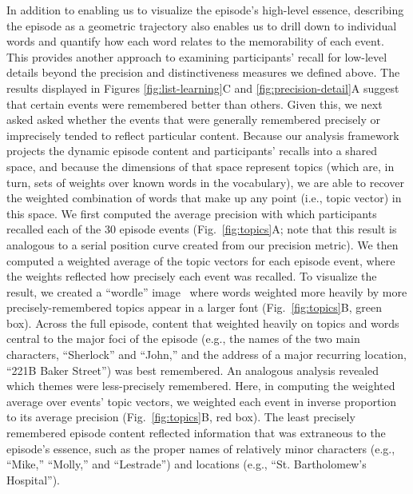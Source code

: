 \documentclass[10pt]{article}
\begin{document}
In addition to enabling us to visualize the episode's high-level essence, describing the episode as a geometric trajectory also enables us to drill down to individual words and quantify how each word relates to the memorability of each event.  This provides another approach to examining participants' recall for low-level details beyond the precision and distinctiveness measures we defined above.  The results displayed in Figures \ref{fig:list-learning}C and \ref{fig:precision-detail}A suggest that certain events were remembered better than others.  Given this, we next asked asked whether the events that were generally remembered precisely or imprecisely tended to reflect particular content.  Because our analysis framework projects the dynamic episode content and participants' recalls into a shared space, and because the dimensions of that space represent topics (which are, in turn, sets of weights over known words in the vocabulary), we are able to recover the weighted combination of words that make up any point (i.e., topic vector) in this space.  We first computed the average precision with which participants recalled each of the 30 episode events (Fig.~\ref{fig:topics}A; note that this result is analogous to a serial position curve created from our precision metric).  We then computed a weighted average of the topic vectors for each episode event, where the weights reflected how precisely each event was recalled.  To visualize the result, we created a ``wordle'' image~\citep{MuelEtal18} where words weighted more heavily by more precisely-remembered topics appear in a larger font (Fig.~\ref{fig:topics}B, green box).  Across the full episode, content that weighted heavily on topics and words central to the major foci of the episode (e.g., the names of the two main characters, ``Sherlock'' and ``John,'' and the address of a major recurring location, ``221B Baker Street'') was best remembered.  An analogous analysis revealed which themes were less-precisely remembered.  Here, in computing the weighted average over events' topic vectors, we weighted each event in inverse proportion to its average precision (Fig.~\ref{fig:topics}B, red box).  The least precisely remembered episode content reflected information that was extraneous to the episode's essence, such as the proper names of relatively minor characters (e.g., ``Mike,'' ``Molly,'' and ``Lestrade'') and locations (e.g., ``St. Bartholomew's Hospital'').
\end{document}
